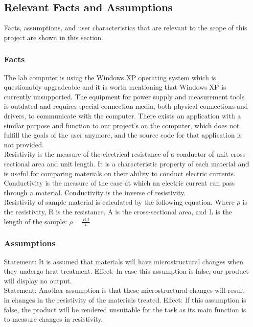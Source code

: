 \documentclass[12pt, titlepage]{article}
\begin{document}
\subsection{Relevant Facts and Assumptions}
Facts, assumptions, and user characteristics that are relevant to the scope of this project are shown in this section.

\subsubsection{Facts}
The lab computer is using the Windows XP operating system which is questionably upgradeable and it is worth mentioning that Windows XP is currently unsupported. The equipment for power supply and measurement tools is outdated and requires special connection media, both physical connections and drivers, to communicate with the computer. There exists an application with a similar purpose and function to our project’s on the computer, which does not fulfill the goals of the user anymore, and the source code for that application is not provided.\\

\noindent Resistivity is the measure of the electrical resistance of a conductor of unit cross-sectional area and unit length. It is a characteristic property of each material and is useful for comparing materials on their ability to conduct electric currents. Conductivity is the measure of the ease at which an electric current can pass through a material. Conductivity is the inverse of resistivity. \\

\noindent Resistivity of sample material is calculated by the following equation. Where $\rho$ is the resistivity, R is the resistance, A is the cross-sectional area, and L is the length of the sample:
$ \rho = \frac{RA}{L} $

\subsubsection{Assumptions}
Statement: It is assumed that materials will have microstructural changes when they undergo heat treatment. 
Effect: In case this assumption is false, our product will display no output. \\

\noindent Statement: Another assumption is that these microstructural changes will result in changes in the resistivity of the materials treated. 
Effect: If this assumption is false, the product will be rendered unsuitable for the task as its main function is to measure changes in resistivity.\\
\end{document}
